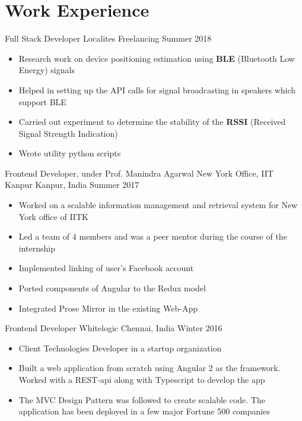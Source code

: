 \section*{\sc Work Experience}
\vspace{-2mm}
\hrulefill
\vspace{2mm}

\cventry
{Full Stack Developer}
{Localites}
{Freelancing}
{Summer 2018}
{
  \begin{itemize}
    \item Research work on device positioning estimation using \textbf{BLE} (Bluetooth
        Low Energy) signals
    \item Helped in setting up the API calls for signal broadcasting in speakers
      which support BLE
    \item Carried out experiment to determine the stability of the \textbf{RSSI}
      (Received Signal Strength Indication)
    \item Wrote utility python scripts 
    \end{itemize}
}

\cventry
{Frontend Developer, under Prof. Manindra Agarwal}
{New York Office, IIT Kanpur}
{Kanpur, India}
{Summer 2017}
{
  \begin{itemize}
  \item Worked on a scalable information management and retrieval system for New York office of IITK
  \item Led a team of 4 members and was a peer mentor during the course of the internship
  \item Implemented linking of user's Facebook account
  \item Ported components of Angular to the Redux model
  \item Integrated Prose Mirror in the existing Web-App
  \end{itemize}
}

\cventry
{Frontend Developer}
{Whitelogic}
{Chennai, India}
{Winter 2016}
{
  \begin{itemize}
  \item Client Technologies Developer in a startup organization
  \item Built a web application from scratch using Angular 2 as the framework.
   Worked with a REST-api along with Typescript to develop the app
  \item The MVC Design Pattern was followed to create scalable code. The application
    has been deployed in a few major Fortune 500 companies
  \end{itemize}
}



